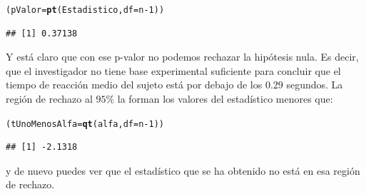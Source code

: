 \documentclass[10pt,a4paper]{article}\usepackage[]{graphicx}\usepackage[]{color}
\makeatletter
\newcommand{\hlnum}[1]{\textcolor[rgb]{0.686,0.059,0.569}{#1}}%
\newcommand{\hlopt}[1]{\textcolor[rgb]{0,0,0}{#1}}%
\newcommand{\hlstd}[1]{\textcolor[rgb]{0.345,0.345,0.345}{#1}}%
\newcommand{\hlkwb}[1]{\textcolor[rgb]{0.69,0.353,0.396}{#1}}%
\newcommand{\hlkwc}[1]{\textcolor[rgb]{0.333,0.667,0.333}{#1}}%
\newcommand{\hlkwd}[1]{\textcolor[rgb]{0.737,0.353,0.396}{\textbf{#1}}}%
\newenvironment{kframe}{%
 \def\at@end@of@kframe{}%
 \ifinner\ifhmode%
  \def\at@end@of@kframe{\end{minipage}}%
  \begin{minipage}{\columnwidth}%
 \fi\fi%
 \def\FrameCommand##1{\hskip\@totalleftmargin \hskip-\fboxsep
 \colorbox{shadecolor}{##1}\hskip-\fboxsep
     \hskip-\linewidth \hskip-\@totalleftmargin \hskip\columnwidth}%
 \MakeFramed {\advance\hsize-\width
   \@totalleftmargin\z@ \linewidth\hsize
   \@setminipage}}%
 {\par\unskip\endMakeFramed%
 \at@end@of@kframe}
\newenvironment{knitrout}{}{} %
\makeatother
\begin{document}
\begin{enumerate}
\begin{knitrout}
\begin{kframe}
\begin{alltt}
\hlstd{(pValor} \hlkwb{=} \hlkwd{pt}\hlstd{(Estadistico,} \hlkwc{df} \hlstd{= n} \hlopt{-} \hlnum{1}\hlstd{))}
\end{alltt}
\begin{verbatim}
## [1] 0.37138
\end{verbatim}
\end{kframe}
\end{knitrout}
  Y está claro que con ese p-valor no podemos rechazar la hipótesis nula. Es decir, que el investigador no tiene base experimental suficiente para concluir que el  tiempo de reacción medio del sujeto está por debajo de los $0.29$ segundos. La región de rechazo al $95\%$ la forman los valores del estadístico menores que:
\begin{knitrout}
\color{fgcolor}\begin{kframe}
\begin{alltt}
\hlstd{(tUnoMenosAlfa} \hlkwb{=} \hlkwd{qt}\hlstd{(alfa,} \hlkwc{df} \hlstd{= n}\hlopt{-}\hlnum{1}\hlstd{))}
\end{alltt}
\begin{verbatim}
## [1] -2.1318
\end{verbatim}
\end{kframe}
\end{knitrout}
  y de nuevo puedes ver que el estadístico que se ha obtenido no está en esa región de rechazo.


\end{enumerate}
\end{document}
